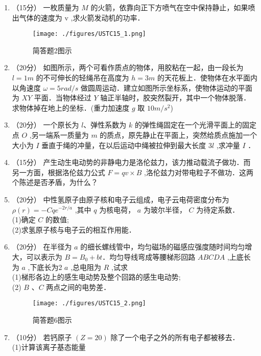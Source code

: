 

\begin{enumerate}
\item （15分）
一枚质量为 $M$ 的火箭，依靠向正下方喷气在空中保持静止，如果喷出气体的速度为  $\mathrm v$ ,求火箭发动机的功率．\\
\begin{figure}[ht]
\centering
\texttt{[image: ./figures/USTC15\_1.png]}
\caption{简答题2图示} \label{USTC15_fig1}
\end{figure}
\item （20分）
如图所示，两个可看作质点的物体，用胶粘在一起，由一段长为 $l=1m$ 的不可伸长的轻绳吊在高度为 $h=3m$ 的天花板上．使物体在水平面内以角速度 $\omega=5rad/s$ 做圆周运动．建立如图所示坐标系，使物体运动的平面为 $XY$ 平面．当物体经过 $Y$ 轴正半轴时，胶突然裂开，其中一个物体脱落．求物体掉在地上的坐标．(重力加速度 $g$ 取 $10m/s^2$)
\item （20分）
一个原长为 $l$、弹性系数为 $k$ 的弹性绳固定在一个光滑平面上的固定点 $O$ ,另一端系一质量为 $m$ 的质点，原先静止在平面上，突然给质点施加一个大小为 $I$ 垂直于绳的冲量，在以后运动中绳被拉伸到最大长度 3$l$ ,求冲量 $I$ ．
\item （15分）
产生动生电动势的非静电力是洛伦兹力，该力推动载流子做功．而另一方面，根据洛伦兹力公式 $F=qv\times B$ ,洛伦兹力对带电粒子不做功．这两个陈述是否矛盾，为什么？
\item （20分）
中性氢原子由原子核和电子云组成，电子云电荷密度分布为 $\rho(r)=-Cqe^{-2r/a}$ ,其中 $q$ 为核电荷， $a$ 为玻尔半径， $C$ 为待定系数．\\
(1)确定 $C$ 的数值;\\
(2)求氢原子核与电子云的相互作用能．
\item （20分）
在半径为 $a$ 的细长螺线管中，均匀磁场的磁感应强度随时间均匀增大，可以表示为 $B=B_0+bt$．均匀导线弯成等腰梯形回路 $ABCDA$ ,上底长为 $a$ ,下底长为2 $a$ ,总电阻为 $R$ ,试求\\
(1)梯形各边上的感生电动势及整个回路的感生电动势;\\
(2) $B$ 、$C$ 两点之间的电势差．\\
\begin{figure}[ht]
\centering
\texttt{[image: ./figures/USTC15\_2.png]}
\caption{简答题6图示} \label{USTC15_fig2}
\end{figure}
\item （10分）
若钙原子 $(Z=20)$ 除了一个电子之外的所有电子都被移去．\\
(1)计算该离子基态能量\\

\end{enumerate}
